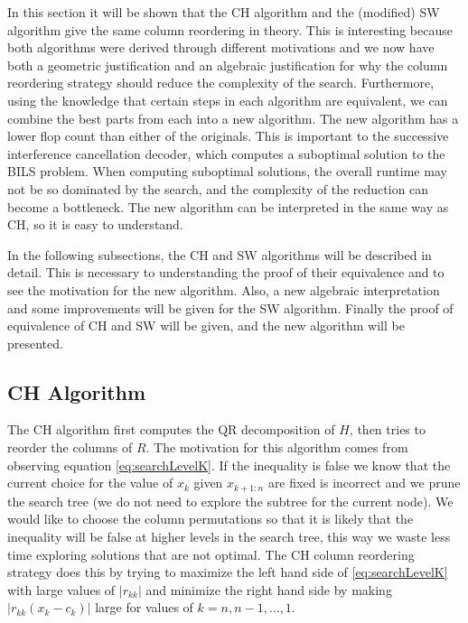 \documentclass[12pt,Bold,letterpaper]{mcgilletdclass}
\newcommand{\vsp}{\vspace{\baselineskip}}
\begin{document}
In this section it will be shown that the CH algorithm and the  (modified)  SW algorithm give the same
column reordering in theory. This is interesting because both algorithms were derived through different motivations
and we now have both a geometric justification and an algebraic justification 
for why the column reordering strategy should reduce the complexity of the search.
Furthermore, using the knowledge that certain steps in each algorithm are equivalent,
we can combine the best parts from each into a new algorithm. The new algorithm
has a lower flop count than either of the originals.
This is important to the successive interference cancellation decoder, 
which computes a suboptimal solution to the BILS problem. When computing suboptimal solutions, the overall runtime may not be so dominated by the search, and the complexity of the reduction can become a bottleneck.
The new algorithm can be interpreted in the same way as CH,
so it is easy to understand. 

In the following subsections, the CH and SW algorithms will be described in detail. This is necessary to understanding the proof of their equivalence and to see the motivation for the new algorithm. Also, a new algebraic interpretation and some improvements will be given for the SW algorithm. Finally the proof of equivalence of CH and SW will be given, and the new algorithm will be presented.

\vsp \subsection{CH Algorithm} \label{subsec:CH}
The CH algorithm first computes the QR decomposition of $H$,
then  tries to reorder the columns of $R$.
The motivation for this algorithm comes from observing equation \eqref{eq:searchLevelK}.
If the inequality is false we know that the current choice for the value of
$x_k$ given $x_{k+1:n}$ are fixed is incorrect and we prune the search tree (we do not need to explore the subtree for the current node). We
would like to choose the column permutations so that it is likely that the
inequality will be false at higher levels in the search tree, this way we waste less time exploring solutions that are not optimal. The CH column reordering strategy
does this by trying to maximize the left hand side of  \eqref{eq:searchLevelK} with large values of $\left | r_{kk}
\right |$ and minimize the right hand side by making $\left | r_{kk}(x_k-c_k) \right |$
large for values of $k = n,n-1, \dots, 1$.
\end{document}
